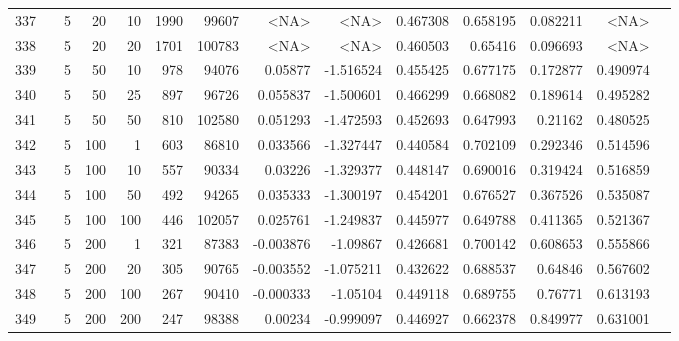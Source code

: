 \begin{longtable}{llrrrrrrrrrrrr}
		337 & &            5 &                20 &           10 &           1990 &      99607 &      <NA> &      <NA> &  0.467308 &    0.658195 &       0.082211 &  <NA> \\
		338 & &            5 &                20 &           20 &           1701 &     100783 &      <NA> &      <NA> &  0.460503 &     0.65416 &       0.096693 &  <NA> \\
		339 & &            5 &                50 &           10 &         978 &      94076 &   0.05877 & -1.516524 &  0.455425 &    0.677175 &       0.172877 &  0.490974 \\
		340 & &            5 &                50 &           25 &         897 &      96726 &  0.055837 & -1.500601 &  0.466299 &    0.668082 &       0.189614 &  0.495282 \\
		341 & &            5 &                50 &           50 &         810 &     102580 &  0.051293 & -1.472593 &  0.452693 &    0.647993 &        0.21162 &  0.480525 \\
		342 & &            5 &               100 &            1 &         603 &      86810 &  0.033566 & -1.327447 &  0.440584 &    0.702109 &       0.292346 &  0.514596 \\
		343 & &            5 &               100 &           10 &         557 &      90334 &   0.03226 & -1.329377 &  0.448147 &    0.690016 &       0.319424 &  0.516859 \\
		344 & &            5 &               100 &           50 &         492 &      94265 &  0.035333 & -1.300197 &  0.454201 &    0.676527 &       0.367526 &  0.535087 \\
		345 & &            5 &               100 &          100 &         446 &     102057 &  0.025761 & -1.249837 &  0.445977 &    0.649788 &       0.411365 &  0.521367 \\
		346 & &            5 &               200 &            1 &         321 &      87383 & -0.003876 &  -1.09867 &  0.426681 &    0.700142 &       0.608653 &  0.555866 \\
		347 & &            5 &               200 &           20 &         305 &      90765 & -0.003552 & -1.075211 &  0.432622 &    0.688537 &        0.64846 &  0.567602 \\
		348 & &            5 &               200 &          100 &         267 &      90410 & -0.000333 &  -1.05104 &  0.449118 &    0.689755 &        0.76771 &  0.613193 \\
		349 & &            5 &               200 &          200 &         247 &      98388 &   0.00234 & -0.999097 &  0.446927 &    0.662378 &       0.849977 &  0.631001 \\

\end{longtable}
